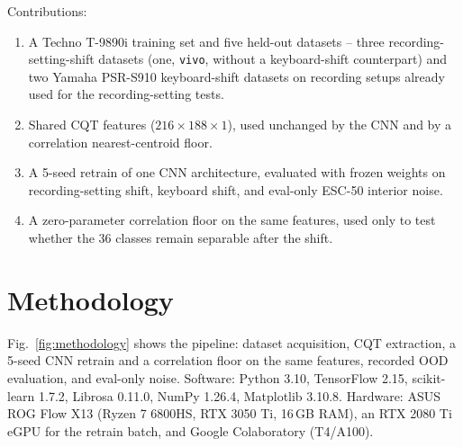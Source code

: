 \documentclass[pdflatex,sn-mathphys-num,iicol]{sn-jnl}
\theoremstyle{thmstyleone}
\theoremstyle{thmstyletwo}
\theoremstyle{thmstylethree}
\begin{document}
Contributions:
\begin{enumerate}[1.]
\item A Techno T-9890i training set and five held-out datasets -- three recording-setting-shift datasets (one, \texttt{vivo}, without a keyboard-shift counterpart) and two Yamaha PSR-S910 keyboard-shift datasets on recording setups already used for the recording-setting tests.
\item Shared CQT features ($216\times188\times1$), used unchanged by the CNN and by a correlation nearest-centroid floor.
\item A 5-seed retrain of one CNN architecture, evaluated with frozen weights on recording-setting shift, keyboard shift, and eval-only ESC-50 interior noise.
\item A zero-parameter correlation floor on the same features, used only to test whether the 36 classes remain separable after the shift.
\end{enumerate}

\section{Methodology}\label{sec3}

Fig.~\ref{fig:methodology} shows the pipeline: dataset acquisition, CQT extraction, a 5-seed CNN retrain and a correlation floor on the same features, recorded OOD evaluation, and eval-only noise. Software: Python 3.10, TensorFlow 2.15, scikit-learn 1.7.2, Librosa 0.11.0, NumPy 1.26.4, Matplotlib 3.10.8. Hardware: ASUS ROG Flow X13 (Ryzen 7 6800HS, RTX 3050 Ti, 16\,GB RAM), an RTX 2080 Ti eGPU for the retrain batch, and Google Colaboratory (T4/A100).
\end{document}
